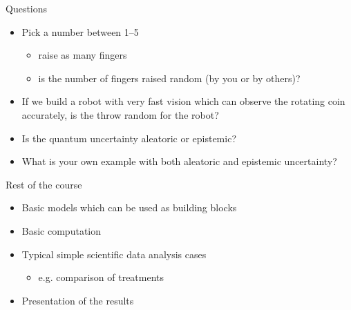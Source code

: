 \documentclass[english,t]{beamer}
\begin{document}
\begin{frame}{Questions}

  \begin{itemize}
  \item<1-> Pick a number between 1--5
    \begin{itemize}
    \item<2-> raise as many fingers 
    \item<3-> is the number of fingers raised random (by you or by others)?
    \end{itemize}
    \vspace{\baselineskip}
  \item<4-> If we build a robot with very fast vision which can observe
    the rotating coin accurately, is the throw random for the robot?
    \vspace{\baselineskip}
  \item<5-> Is the quantum uncertainty aleatoric or epistemic?
    \vspace{\baselineskip}
  \item<6-> What is your own example with both aleatoric and epistemic
    uncertainty?
  \end{itemize}
\end{frame}

\begin{frame}{Rest of the course}

  \begin{itemize}
  \item Basic models which can be used as building blocks
    \vspace{\baselineskip}
  \item Basic computation
    \vspace{\baselineskip}
  \item Typical simple scientific data analysis cases
     \begin{itemize}
     \item e.g. comparison of treatments
     \end{itemize}
    \vspace{\baselineskip}
  \item Presentation of the results
  \end{itemize}
\end{frame}
\end{document}

